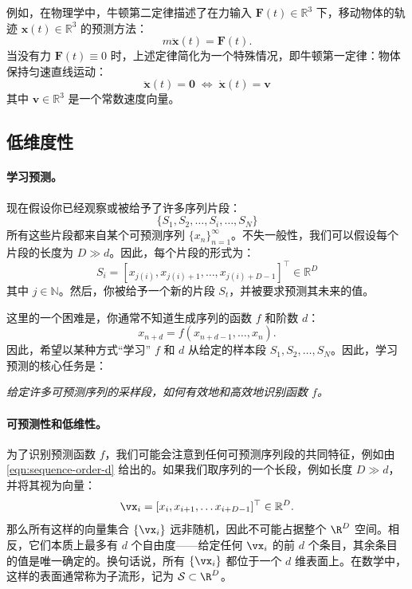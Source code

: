 \documentclass[../../book-main.tex]{subfiles}
\begin{document}
\begin{example}
    例如，在物理学中，牛顿第二定律描述了在力输入 $\boldsymbol{F}(t) \in \mathbb{R}^3$ 下，移动物体的轨迹 $\boldsymbol{x}(t) \in \mathbb{R}^3$ 的预测方法：
\begin{equation}
    m\ddot{\boldsymbol{x}}(t) = \boldsymbol{F}(t).
\end{equation}
当没有力 $\boldsymbol{F}(t) \equiv 0$ 时，上述定律简化为一个特殊情况，即牛顿第一定律：物体保持匀速直线运动：
\begin{equation}
   \ddot{\boldsymbol{x}}(t) = \boldsymbol{0} \; \Leftrightarrow \; \dot{\boldsymbol{x}}(t) = \boldsymbol{v}
\end{equation}
其中 $\boldsymbol{v} \in \mathbb{R}^3$ 是一个常数速度向量。
\end{example}

\subsection{低维度性}\label{sec:intro-low-dimensionality}
\paragraph{学习预测。}
现在假设你已经观察或被给予了许多序列片段：
\begin{equation}
    \{S_1, S_2, \ldots, S_i, \ldots, S_N\}
\end{equation}
所有这些片段都来自某个可预测序列 $\{x_n\}_{n=1}^\infty$。不失一般性，我们可以假设每个片段的长度为 $D \gg d$。因此，每个片段的形式为：
\begin{equation}
    S_i = [x_{j(i)}, x_{j(i)+1}, \ldots, x_{j(i)+D-1}]^\top \in \mathbb{R}^D
\end{equation}
其中 $j \in \mathbb{N}$。然后，你被给予一个新的片段 $S_t$，并被要求预测其未来的值。

这里的一个困难是，你通常不知道生成序列的函数 $f$ 和阶数 $d$：
\begin{equation}
    x_{n+d} = f(x_{n+d-1}, \ldots,  x_{n}).
\label{eqn:sequence-order-d}
\end{equation}
因此，希望以某种方式“学习” $f$ 和 $d$ 从给定的样本段 $S_1, S_2, \ldots, S_N$。因此，学习预测的核心任务是：
\begin{center}
{\em 给定许多可预测序列的采样段，如何有效地和高效地识别函数 $f$。}
\end{center}

\paragraph{可预测性和低维性。}
为了识别预测函数 $f$，我们可能会注意到任何可预测序列段的共同特征，例如由 \eqref{eqn:sequence-order-d} 给出的。如果我们取序列的一个长段，例如长度 $D \gg d$，并将其视为向量：
\begin{equation}
    \vx_i = [x_i, x_{i+1}, \ldots x_{i+D-1}]^\top \in \mathbb{R}^D.
\end{equation}
那么所有这样的向量集合 $\{\vx_i\}$ 远非随机，因此不可能占据整个 $\R^D$ 空间。相反，它们本质上最多有 $d$ 个自由度——给定任何 $\vx_i$ 的前 $d$ 个条目，其余条目的值是唯一确定的。换句话说，所有 $\{\vx_i\}$ 都位于一个 $d$ 维表面上。在数学中，这样的表面通常称为子流形，记为 $\mathcal{S} \subset \R^D$。
\end{document}
